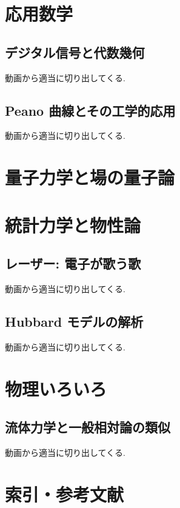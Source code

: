 \documentclass[openany, a4paper, oneside]{jsbook}
\begin{document}
\part{応用数学}

\chapter{デジタル信号と代数幾何}

動画から適当に切り出してくる.
\chapter{Peano 曲線とその工学的応用}

動画から適当に切り出してくる.
\part{量子力学と場の量子論}

\part{統計力学と物性論}

\chapter{レーザー: 電子が歌う歌}

動画から適当に切り出してくる.
\chapter{Hubbard モデルの解析}

動画から適当に切り出してくる.
\part{物理いろいろ}

\chapter{流体力学と一般相対論の類似}

動画から適当に切り出してくる.
\part{索引・参考文献}

\nocite{*}
\printindex

\end{document}
